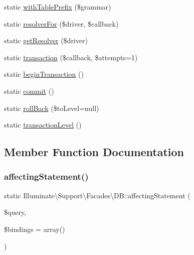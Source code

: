 \begin{DoxyCompactItemize}
\item 
static \mbox{\hyperlink{class_illuminate_1_1_support_1_1_facades_1_1_d_b_a6f0a757193d06d182a275d5db6508f5e}{with\+Table\+Prefix}} (\$grammar)
\item 
static \mbox{\hyperlink{class_illuminate_1_1_support_1_1_facades_1_1_d_b_a10db5fb30457d640eea8b068d3012141}{resolver\+For}} (\$driver, \$callback)
\item 
static \mbox{\hyperlink{class_illuminate_1_1_support_1_1_facades_1_1_d_b_a098ac61334abaebf74a0c46ed69eb935}{get\+Resolver}} (\$driver)
\item 
static \mbox{\hyperlink{class_illuminate_1_1_support_1_1_facades_1_1_d_b_a1d5bf5be3c6dcae5917b448f18ff67a6}{transaction}} (\$callback, \$attempts=1)
\item 
static \mbox{\hyperlink{class_illuminate_1_1_support_1_1_facades_1_1_d_b_ae7c00d6d13e51835129058756dc30a6d}{begin\+Transaction}} ()
\item 
static \mbox{\hyperlink{class_illuminate_1_1_support_1_1_facades_1_1_d_b_ab0eda4c9662e5437e6bc14ba068b7a19}{commit}} ()
\item 
static \mbox{\hyperlink{class_illuminate_1_1_support_1_1_facades_1_1_d_b_a34ba448ce0e8c6bf4128756ee3a591fe}{roll\+Back}} (\$to\+Level=null)
\item 
static \mbox{\hyperlink{class_illuminate_1_1_support_1_1_facades_1_1_d_b_a57ef617f66d04d72755eb52f0ec69785}{transaction\+Level}} ()
\end{DoxyCompactItemize}


\subsection{Member Function Documentation}
\mbox{\label{class_illuminate_1_1_support_1_1_facades_1_1_d_b_a1ab200d539f4612e0baf5c935b8f73fe}} 
\subsubsection{\texorpdfstring{affecting\+Statement()}{affectingStatement()}}
{\footnotesize\ttfamily static Illuminate\textbackslash{}\+Support\textbackslash{}\+Facades\textbackslash{}\+D\+B\+::affecting\+Statement (\begin{DoxyParamCaption}\item[{}]{\$query,  }\item[{}]{\$bindings = {\ttfamily array()} }\end{DoxyParamCaption})\hspace{0.3cm}{\ttfamily [static]}}


